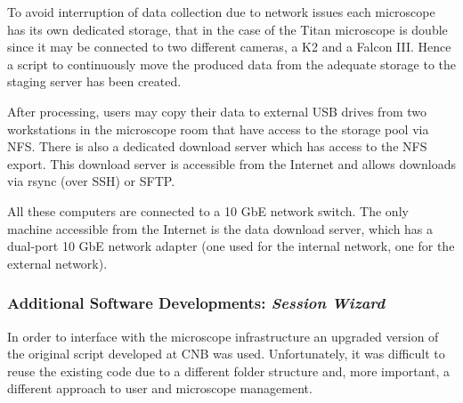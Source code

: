 
To avoid interruption of data collection due to network issues each microscope has its own dedicated storage, that in the case of the Titan microscope is double since it may be connected to two different cameras, a K2 and a Falcon III. Hence a script to continuously move the produced data from the adequate storage to the staging server has been created. 


After processing, users may  copy their data to external USB drives from two workstations in the microscope room that have access to the storage pool via NFS.
There is also a dedicated download server which has access to the NFS export. This download server is accessible from  the Internet and allows downloads via rsync (over SSH) or SFTP. 

All these computers are connected to a 10 GbE network switch. The only machine accessible from the Internet is the data download server, which has a dual-port 10 GbE network adapter (one used for the internal network, one for the external network). %

\subsubsection{Additional Software Developments: \emph{Session Wizard}}
In order to interface \scipion with the microscope infrastructure an upgraded version of the original script developed at CNB was used. Unfortunately, it was difficult to reuse the existing code due to a different folder structure and, more important, a different approach to user and microscope management. %

